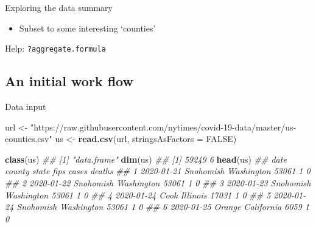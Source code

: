 \documentclass[
]{book}
\newenvironment{Shaded}{\begin{snugshade}}{\end{snugshade}}
\newcommand{\CommentTok}[1]{\textcolor[rgb]{0.56,0.35,0.01}{\textit{#1}}}
\newcommand{\DataTypeTok}[1]{\textcolor[rgb]{0.13,0.29,0.53}{#1}}
\newcommand{\KeywordTok}[1]{\textcolor[rgb]{0.13,0.29,0.53}{\textbf{#1}}}
\newcommand{\NormalTok}[1]{#1}
\newcommand{\OperatorTok}[1]{\textcolor[rgb]{0.81,0.36,0.00}{\textbf{#1}}}
\newcommand{\OtherTok}[1]{\textcolor[rgb]{0.56,0.35,0.01}{#1}}
\newcommand{\StringTok}[1]{\textcolor[rgb]{0.31,0.60,0.02}{#1}}
\begin{document}
Exploring the data summary

\begin{itemize}
\item
  Subset to some interesting `counties'

\begin{Shaded}
\end{Shaded}
\end{itemize}

Help: \texttt{?aggregate.formula}

\hypertarget{an-initial-work-flow}{%
\subsection*{An initial work flow}\label{an-initial-work-flow}}

Data input

\begin{Shaded}
\begin{Highlighting}[]
\NormalTok{url <-}\StringTok{ "https://raw.githubusercontent.com/nytimes/covid-19-data/master/us-counties.csv"}
\NormalTok{us <-}\StringTok{ }\KeywordTok{read.csv}\NormalTok{(url, }\DataTypeTok{stringsAsFactors =} \OtherTok{FALSE}\NormalTok{)}
\end{Highlighting}
\end{Shaded}

\begin{Shaded}
\begin{Highlighting}[]
\KeywordTok{class}\NormalTok{(us)}
\CommentTok{## [1] "data.frame"}
\KeywordTok{dim}\NormalTok{(us)}
\CommentTok{## [1] 59249     6}
\KeywordTok{head}\NormalTok{(us)}
\CommentTok{##         date    county      state  fips cases deaths}
\CommentTok{## 1 2020-01-21 Snohomish Washington 53061     1      0}
\CommentTok{## 2 2020-01-22 Snohomish Washington 53061     1      0}
\CommentTok{## 3 2020-01-23 Snohomish Washington 53061     1      0}
\CommentTok{## 4 2020-01-24      Cook   Illinois 17031     1      0}
\CommentTok{## 5 2020-01-24 Snohomish Washington 53061     1      0}
\CommentTok{## 6 2020-01-25    Orange California  6059     1      0}
\end{Highlighting}
\end{Shaded}
\end{document}
